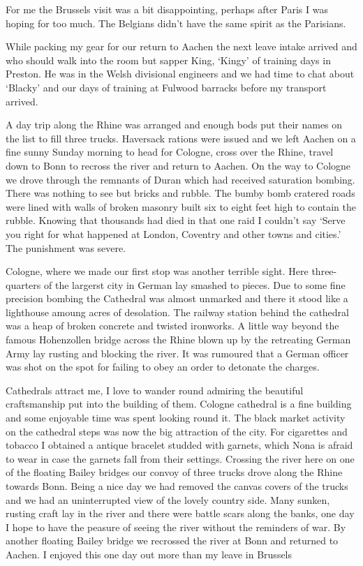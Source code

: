 For me the Brussels visit was a bit disappointing, perhaps after Paris
I was hoping for too much. The Belgians didn't have the same spirit as
the Parisians.

While packing my gear for our return to Aachen the next leave intake
arrived and who should walk into the room but sapper King, `Kingy' of
training days in Preston. He was in the Welsh divisional engineers and
we had time to chat about `Blacky' and our days of training at Fulwood
barracks before my transport arrived.

A day trip along the Rhine was arranged and enough bods put their
names on the list to fill three trucks. Haversack rations were issued
and we left Aachen on a fine sunny Sunday morning to head for Cologne,
cross over the Rhine, travel down to Bonn to recross the river and
return to Aachen. On the way to Cologne we drove through the remnants
of Duran which had received saturation bombing. There was nothing to
see but bricks and rubble. The bumby bomb cratered roads were lined
with walls of broken masonry built six to eight feet high to contain
the rubble. Knowing that thousands had died in that one raid I
couldn't say `Serve you right for what happened at London, Coventry
and other towns and cities.' The punishment was severe.

Cologne, where we made our first stop was another terrible sight. Here
three-quarters of the largerst city in German lay smashed to
pieces. Due to some fine precision bombing the Cathedral was almost
unmarked and there it stood like a lighthouse amoung acres of
desolation. The railway station behind the cathedral was a heap of
broken concrete and twisted ironworks. A little way beyond the famous
Hohenzollen bridge across the Rhine blown up by the retreating German
Army lay rusting and blocking the river. It was rumoured that a German
officer was shot on the spot for failing to obey an order to detonate
the charges.

Cathedrals attract me, I love to wander round admiring the beautiful
craftsmanship put into the building of them. Cologne cathedral is a
fine building and some enjoyable time was spent looking round it. The
black market activity on the cathedral steps was now the big
attraction of the city. For cigarettes and tobacco I obtained a
antique bracelet studded with garnets, which Nona is afraid to wear in
case the garnets fall from their settings. Crossing the river here on
one of the floating Bailey bridges our convoy of three trucks drove
along the Rhine towards Bonn. Being a nice day we had removed the
canvas covers of the trucks and we had an uninterrupted view of the
lovely country side. Many sunken, rusting craft lay in the river and
there were battle scars along the banks, one day I hope to have the
peasure of seeing the river without the reminders of war. By another
floating Bailey bridge we recrossed the river at Bonn and returned to
Aachen. I enjoyed this one day out more than my leave in Brussels

